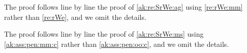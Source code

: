 \begin{pro}
The proof follows line by line the proof of \cref{ak:re:SrWe:ag} using
\cref{re:rWe:mm} rather than \cref{re:rWe}, and we omit the details.\proEnd  
\end{pro}
\begin{pro}
The proof follows line by line the proof of \cref{ak:re:SrWe:ms} using
\eqref{ak:ass:pen:mm:c} rather than \eqref{ak:ass:pen:oo:c}, and we omit the details.\proEnd
\end{pro}
